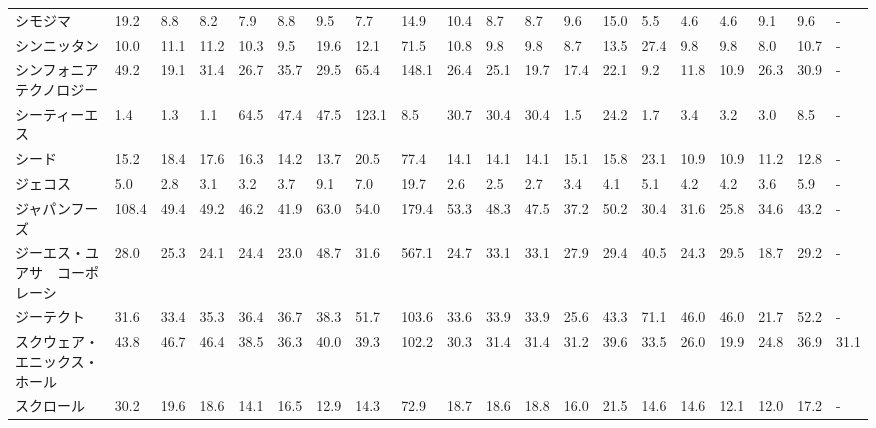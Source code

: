 \begin{longtable}[c]{lp{3mm}p{3mm}p{3mm}p{3mm}p{3mm}p{3mm}p{3mm}p{3mm}p{3mm}p{3mm}p{3mm}p{3mm}p{3mm}p{3mm}p{3mm}p{3mm}p{3mm}p{3mm}p{3mm}}
シモジマ            &   19.2 &    8.8 &       8.2 &       7.9 &        8.8 &     9.5 &     7.7 &     14.9 &    10.4 &     8.7 &    8.7 &    9.6 &    15.0 &     5.5 &     4.6 &    4.6 &    9.1 &     9.6 &      - \\
シンニッタン          &   10.0 &   11.1 &      11.2 &      10.3 &        9.5 &    19.6 &    12.1 &     71.5 &    10.8 &     9.8 &    9.8 &    8.7 &    13.5 &    27.4 &     9.8 &    9.8 &    8.0 &    10.7 &      - \\
シンフォニア　テクノロジー   &   49.2 &   19.1 &      31.4 &      26.7 &       35.7 &    29.5 &    65.4 &    148.1 &    26.4 &    25.1 &   19.7 &   17.4 &    22.1 &     9.2 &    11.8 &   10.9 &   26.3 &    30.9 &      - \\
シーティーエス         &    1.4 &    1.3 &       1.1 &      64.5 &       47.4 &    47.5 &   123.1 &      8.5 &    30.7 &    30.4 &   30.4 &    1.5 &    24.2 &     1.7 &     3.4 &    3.2 &    3.0 &     8.5 &      - \\
シード             &   15.2 &   18.4 &      17.6 &      16.3 &       14.2 &    13.7 &    20.5 &     77.4 &    14.1 &    14.1 &   14.1 &   15.1 &    15.8 &    23.1 &    10.9 &   10.9 &   11.2 &    12.8 &      - \\
ジェコス            &    5.0 &    2.8 &       3.1 &       3.2 &        3.7 &     9.1 &     7.0 &     19.7 &     2.6 &     2.5 &    2.7 &    3.4 &     4.1 &     5.1 &     4.2 &    4.2 &    3.6 &     5.9 &      - \\
ジャパンフーズ         &  108.4 &   49.4 &      49.2 &      46.2 &       41.9 &    63.0 &    54.0 &    179.4 &    53.3 &    48.3 &   47.5 &   37.2 &    50.2 &    30.4 &    31.6 &   25.8 &   34.6 &    43.2 &      - \\
ジーエス・ユアサ　コーポレーシ &   28.0 &   25.3 &      24.1 &      24.4 &       23.0 &    48.7 &    31.6 &    567.1 &    24.7 &    33.1 &   33.1 &   27.9 &    29.4 &    40.5 &    24.3 &   29.5 &   18.7 &    29.2 &      - \\
ジーテクト           &   31.6 &   33.4 &      35.3 &      36.4 &       36.7 &    38.3 &    51.7 &    103.6 &    33.6 &    33.9 &   33.9 &   25.6 &    43.3 &    71.1 &    46.0 &   46.0 &   21.7 &    52.2 &      - \\
スクウェア・エニックス・ホール &   43.8 &   46.7 &      46.4 &      38.5 &       36.3 &    40.0 &    39.3 &    102.2 &    30.3 &    31.4 &   31.4 &   31.2 &    39.6 &    33.5 &    26.0 &   19.9 &   24.8 &    36.9 &   31.1 \\
スクロール           &   30.2 &   19.6 &      18.6 &      14.1 &       16.5 &    12.9 &    14.3 &     72.9 &    18.7 &    18.6 &   18.8 &   16.0 &    21.5 &    14.6 &    14.6 &   12.1 &   12.0 &    17.2 &      - \\

\end{longtable}
